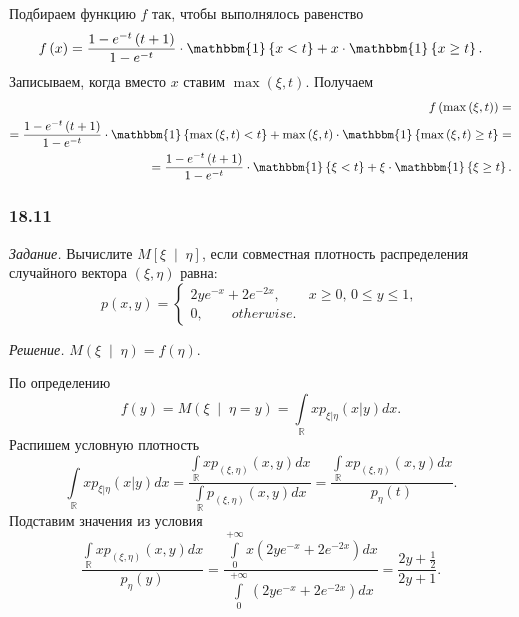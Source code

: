 \begin{enumerate}[label=\alph*)]
  Подбираем функцию $f$ так, чтобы выполнялось равенство
  $$f \left( x \right) =
    \frac{1 - e^{-t} \left( t + 1 \right) }{1 - e^{-t}} \cdot \mathbbm{1} \left\{ x < t \right\} +
    x \cdot \mathbbm{1} \left\{ x \geq t \right\}.$$
  Записываем, когда вместо $x$ ставим $ \max \left( \xi, t \right) $.
  Получаем
  \begin{equation*}
    \begin{split}
      f \left( \max \left( \xi, t \right) \right) = \\
      = \frac{1 - e^{-t} \left( t + 1 \right) }{1 - e^{-t}} \cdot
      \mathbbm{1} \left\{ \max \left( \xi, t \right) < t \right\} +
      \max \left( \xi, t \right) \cdot
      \mathbbm{1} \left\{ \max \left( \xi, t \right) \geq t \right\} = \\
      = \frac{1 - e^{-t} \left( t + 1 \right) }{1 - e^{-t}} \cdot
      \mathbbm{1} \left\{ \xi < t \right\} +
      \xi \cdot \mathbbm{1} \left\{ \xi \geq t \right\}.
    \end{split}
  \end{equation*}
\end{enumerate}

\subsubsection*{18.11}

\textit{Задание.}
Вычислите $M \left[ \xi \; \middle| \; \eta \right] $,
если совместная плотность распределения случайного вектора $ \left( \xi, \eta \right) $ равна:
$$p \left( x, y \right) =
  \begin{cases}
    2ye^{-x} + 2e^{-2x}, \qquad x \geq 0, \, 0 \leq y \leq 1, \\
    0, \qquad otherwise.
  \end{cases}$$

\textit{Решение.} $M \left( \xi \; \middle| \; \eta \right) = f \left( \eta \right) $.

По определению
$$f \left( y \right) =
  M \left( \xi \; \middle| \; \eta = y \right) =
  \int \limits_{ \mathbb{R}} xp_{ \left. \xi \right| \eta } \left( \left. x \right| y \right) dx.$$
Распишем условную плотность
$$ \int \limits_{ \mathbb{R}} xp_{ \left. \xi \right| \eta } \left( \left. x \right| y \right) dx =
  \frac{ \int \limits_{ \mathbb{R}} xp_{ \left( \xi, \eta \right) } \left( x, y \right) dx}{ \int \limits_{ \mathbb{R}} p_{ \left( \xi, \eta \right) } \left( x, y \right) dx} =
  \frac{ \int \limits_{ \mathbb{R}} xp_{ \left( \xi, \eta \right) } \left( x, y \right) dx}{p_{ \eta } \left( t \right) }.$$
Подставим значения из условия
$$ \frac{ \int \limits_{ \mathbb{R}} xp_{ \left( \xi, \eta \right) } \left( x, y \right) dx}{p_{ \eta } \left( y \right) } =
  \frac{ \int \limits_0^{+ \infty } x \left( 2ye^{-x} + 2e^{-2x} \right) dx}{ \int \limits_0^{+ \infty } \left( 2ye^{-x} + 2e^{-2x} \right) dx} =
  \frac{2y + \frac{1}{2}}{2y + 1}.$$

